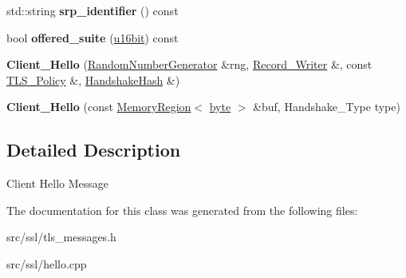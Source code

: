 \begin{DoxyCompactItemize}
\item 
\hypertarget{classBotan_1_1Client__Hello_a0e15db7cf4aa533d256dc0d5bab33fa3}{std\-::string {\bfseries srp\-\_\-identifier} () const }\label{classBotan_1_1Client__Hello_a0e15db7cf4aa533d256dc0d5bab33fa3}

\item 
\hypertarget{classBotan_1_1Client__Hello_a3b8439a08e98dada467987aa06bcd025}{bool {\bfseries offered\-\_\-suite} (\hyperlink{namespaceBotan_ab07face63a00c39ea6ed97f203ee501c}{u16bit}) const }\label{classBotan_1_1Client__Hello_a3b8439a08e98dada467987aa06bcd025}

\item 
\hypertarget{classBotan_1_1Client__Hello_aa2a0489e62cbb21e6fe1198ae5b2d544}{{\bfseries Client\-\_\-\-Hello} (\hyperlink{classBotan_1_1RandomNumberGenerator}{Random\-Number\-Generator} \&rng, \hyperlink{classBotan_1_1Record__Writer}{Record\-\_\-\-Writer} \&, const \hyperlink{classBotan_1_1TLS__Policy}{T\-L\-S\-\_\-\-Policy} \&, \hyperlink{classBotan_1_1HandshakeHash}{Handshake\-Hash} \&)}\label{classBotan_1_1Client__Hello_aa2a0489e62cbb21e6fe1198ae5b2d544}

\item 
\hypertarget{classBotan_1_1Client__Hello_a5f0483833d776f75d227faa7349fb5ff}{{\bfseries Client\-\_\-\-Hello} (const \hyperlink{classBotan_1_1MemoryRegion}{Memory\-Region}$<$ \hyperlink{namespaceBotan_a7d793989d801281df48c6b19616b8b84}{byte} $>$ \&buf, Handshake\-\_\-\-Type type)}\label{classBotan_1_1Client__Hello_a5f0483833d776f75d227faa7349fb5ff}

\end{DoxyCompactItemize}


\subsection{Detailed Description}
Client Hello Message 

The documentation for this class was generated from the following files\-:\begin{DoxyCompactItemize}
\item 
src/ssl/tls\-\_\-messages.\-h\item 
src/ssl/hello.\-cpp\end{DoxyCompactItemize}

